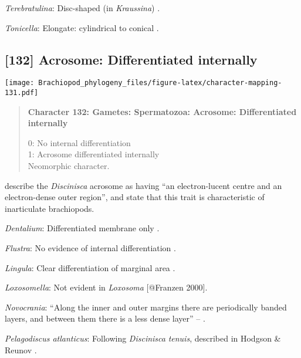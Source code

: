 \documentclass[openany]{book}
\theoremstyle{definition}
\theoremstyle{definition}
\theoremstyle{definition}
\theoremstyle{remark}
\begin{document}
\hypertarget{Terebratulina-coding-131}{}
\emph{Terebratulina}: Disc-shaped (in \emph{Kraussina})
\citep{Hodgson1994Ultrastructureof}.

\hypertarget{Tonicella-coding-131}{}
\emph{Tonicella}: Elongate: cylindrical to conical
\citep{BucklandNicks1988}.

\subsection*{{[}132{]} Acrosome: Differentiated
internally}\label{acrosome-differentiated-internally}

\texttt{[image: Brachiopod\_phylogeny\_files/figure-latex/character-mapping-131.pdf]}

\begin{quote}
\textbf{Character 132: Gametes: Spermatozoa: Acrosome: Differentiated
internally}

0: No internal differentiation\\
1: Acrosome differentiated internally\\
Neomorphic character.
\end{quote}

\citet{Hodgson1994Ultrastructureof} describe the \emph{Discinisca}
acrosome as having ``an electron-lucent centre and an electron-dense
outer region'', and state that this trait is characteristic of
inarticulate brachiopods.

\hypertarget{Dentalium-coding-132}{}
\emph{Dentalium}: Differentiated membrane only \citep{DufresneDube1983}.

\hypertarget{Flustra-coding-132}{}
\emph{Flustra}: No evidence of internal differentiation \citep[in
\emph{Tubulipora};][]{Franzen1984}.

\hypertarget{Lingula-coding-132}{}
\emph{Lingula}: Clear differentiation of marginal area
\citep{Fukumoto2003Theacrosome}.

\hypertarget{Loxosomella-coding-132}{}
\emph{Loxosomella}: Not evident in \emph{Loxosoma} {[}@Franzen 2000{]}.

\hypertarget{Novocrania-coding-132}{}
\emph{Novocrania}: ``Along the inner and outer margins there are
periodically banded layers, and between them there is a less dense
layer'' -- \citet{Afzelius1978Finestructure}.

\hypertarget{Pelagodiscus_atlanticus-coding-132}{}
\emph{Pelagodiscus atlanticus}: Following \emph{Discinisca}
\emph{tenuis}, described in Hodgson \& Reunov
\citeyearpar{Hodgson1994Ultrastructureof}.
\end{document}
